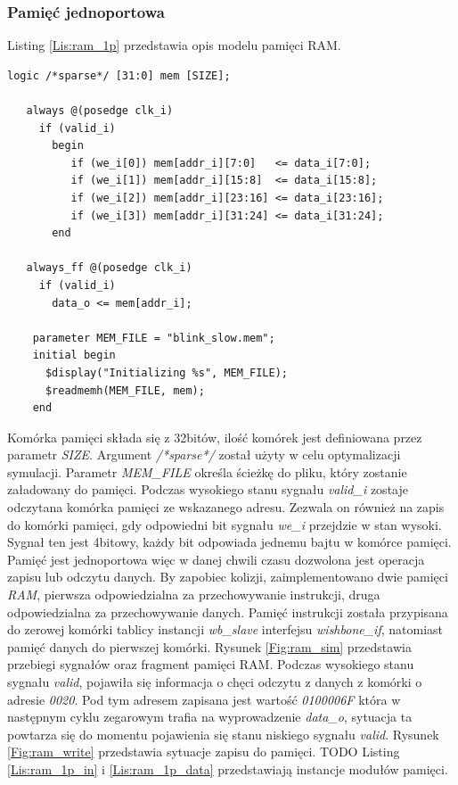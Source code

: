 \documentclass[11pt,a4paper]{article}
\begin{document}
		\subsubsection{Pamięć jednoportowa}
			\hspace{5mm}
			Listing \ref{Lis:ram_1p} przedstawia opis modelu pamięci RAM.\\
			\begin{minipage}{\textwidth}
\begin{scriptsize}
\begin{lstlisting}[label=Lis:ram_1p,caption=Model pamięci RAM]
    logic /*sparse*/ [31:0] mem [SIZE];

   always @(posedge clk_i)
     if (valid_i)
       begin
          if (we_i[0]) mem[addr_i][7:0]   <= data_i[7:0];
          if (we_i[1]) mem[addr_i][15:8]  <= data_i[15:8];
          if (we_i[2]) mem[addr_i][23:16] <= data_i[23:16];
          if (we_i[3]) mem[addr_i][31:24] <= data_i[31:24];
       end

   always_ff @(posedge clk_i)
     if (valid_i)
       data_o <= mem[addr_i];

    parameter MEM_FILE = "blink_slow.mem";
    initial begin
      $display("Initializing %s", MEM_FILE);
      $readmemh(MEM_FILE, mem);
    end
\end{lstlisting}
\end{scriptsize}
\end{minipage}
		Komórka pamięci składa się z 32bitów, ilość komórek jest definiowana przez parametr \textit{SIZE}. Argument \textit{/*sparse*/} został użyty w celu optymalizacji symulacji. Parametr \textit{MEM\_FILE} określa ścieżkę do pliku, który zostanie załadowany do pamięci. Podczas wysokiego stanu sygnału \textit{valid\_i} zostaje odczytana komórka pamięci ze wskazanego adresu. Zezwala on również na zapis do komórki pamięci, gdy odpowiedni bit sygnału \textit{we\_i} przejdzie w stan wysoki. Sygnał ten jest 4bitowy, każdy bit odpowiada jednemu bajtu w komórce pamięci. Pamięć jest jednoportowa więc w danej chwili czasu dozwolona jest operacja zapisu lub odczytu danych. By zapobiec kolizji, zaimplementowano dwie pamięci \textit{RAM}, pierwsza odpowiedzialna za przechowywanie instrukcji, druga odpowiedzialna za przechowywanie danych. Pamięć instrukcji została przypisana do zerowej komórki tablicy instancji \textit{wb\_slave} interfejsu \textit{wishbone\_if}, natomiast pamięć danych do pierwszej komórki. Rysunek \ref{Fig:ram_sim} przedstawia przebiegi sygnałów oraz fragment pamięci RAM. Podczas wysokiego stanu sygnału \textit{valid}, pojawiła się informacja o chęci odczytu z danych z komórki o adresie \textit{0020}. Pod tym adresem zapisana jest wartość \textit{0100006F} która w następnym cyklu zegarowym trafia na wyprowadzenie \textit{data\_o}, sytuacja ta powtarza się do momentu pojawienia się stanu niskiego sygnału \textit{valid}. Rysunek \ref{Fig:ram_write} przedstawia sytuacje zapisu do pamięci. TODO Listing \ref{Lis:ram_1p_in} i \ref{Lis:ram_1p_data} przedstawiają instancje modułów pamięci.\\
\end{document}
